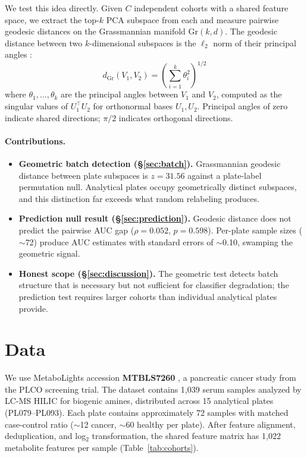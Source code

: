\documentclass{article}
\begin{document}
We test this idea directly. Given $C$ independent cohorts with a shared feature space, we extract the top-$k$ PCA subspace from each and measure pairwise geodesic distances on the Grassmannian manifold $\mathrm{Gr}(k, d)$. The geodesic distance between two $k$-dimensional subspaces is the $\ell_2$ norm of their principal angles \citep{bjorck1973numerical, ye2016schubert}:
\begin{equation}
d_{\mathrm{Gr}}(V_1, V_2) = \left(\sum_{i=1}^{k} \theta_i^2\right)^{1/2}
\end{equation}
where $\theta_1, \ldots, \theta_k$ are the principal angles between $V_1$ and $V_2$, computed as the singular values of $U_1^\top U_2$ for orthonormal bases $U_1, U_2$. Principal angles of zero indicate shared directions; $\pi/2$ indicates orthogonal directions.

\paragraph{Contributions.}
\begin{itemize}
\item \textbf{Geometric batch detection (\S\ref{sec:batch}).} Grassmannian geodesic distance between plate subspaces is $z = 31.56$ against a plate-label permutation null. Analytical plates occupy geometrically distinct subspaces, and this distinction far exceeds what random relabeling produces.
\item \textbf{Prediction null result (\S\ref{sec:prediction}).} Geodesic distance does not predict the pairwise AUC gap ($\rho = 0.052$, $p = 0.598$). Per-plate sample sizes ($\sim$72) produce AUC estimates with standard errors of $\sim$0.10, swamping the geometric signal.
\item \textbf{Honest scope (\S\ref{sec:discussion}).} The geometric test detects batch structure that is necessary but not sufficient for classifier degradation; the prediction test requires larger cohorts than individual analytical plates provide.
\end{itemize}


\section{Data}

We use MetaboLights accession \textbf{MTBLS7260} \citep{leonletelier2024contributions}, a pancreatic cancer study from the PLCO screening trial. The dataset contains 1{,}039 serum samples analyzed by LC-MS HILIC for biogenic amines, distributed across 15 analytical plates (PL079--PL093). Each plate contains approximately 72 samples with matched case-control ratio ($\sim$12 cancer, $\sim$60 healthy per plate). After feature alignment, deduplication, and log$_2$ transformation, the shared feature matrix has 1{,}022 metabolite features per sample (Table~\ref{tab:cohorts}).
\end{document}

